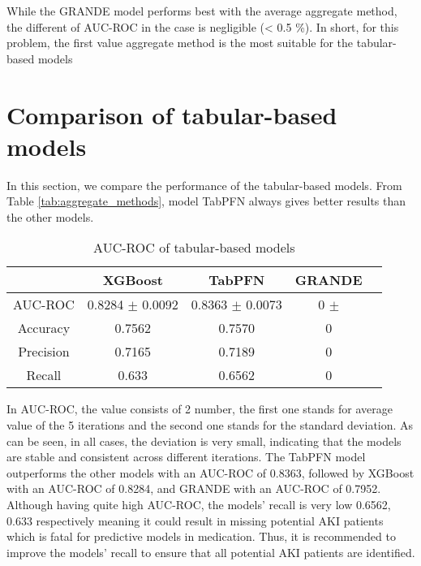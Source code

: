 \documentclass[../main.tex]{subfiles}
\begin{document}
While the GRANDE model performs best with the average aggregate method, the different of AUC-ROC in the case is negligible (< 0.5 \%).
In short, for this problem, the first value aggregate method is the most suitable for the tabular-based models





\section{Comparison of tabular-based models}

In this section, we compare the performance of the tabular-based models. 
From Table \ref{tab:aggregate_methods}, model TabPFN always gives better results than the other models.

\begin{table}[H]
    \centering
    \caption{AUC-ROC of tabular-based models}
    \label{tab:tabular_models}
    \begin{tabular}{|c|c|c|c|c|}
        \hline
        \textbf{} & 
        \textbf{XGBoost} & 
        \textbf{TabPFN} & 
        \textbf{GRANDE} \\
        \hline

        AUC-ROC & 
        0.8284 $\pm$ 0.0092 & 
        0.8363 $\pm$ 0.0073& 
        0 $\pm$ \\

        Accuracy &
        0.7562 &
        0.7570 &
        0 \\

        Precision &
        0.7165 &
        0.7189 &
        0 \\

        Recall &
        0.633 &
        0.6562 &
        0 \\

        \hline
    \end{tabular}
\end{table}

In AUC-ROC, the value consists of 2 number, the first one stands for average value of the 5 iterations and the second one stands for the standard deviation.
As can be seen, in all cases, the deviation is very small, indicating that the models are stable and consistent across different iterations.
The TabPFN model outperforms the other models with an AUC-ROC of 0.8363, followed by XGBoost with an AUC-ROC of 0.8284, and GRANDE with an AUC-ROC of 0.7952.
Although having quite high AUC-ROC, the models' recall is very low 0.6562, 0.633 respectively meaning it could result in missing potential AKI patients which is fatal for predictive models in medication. 
Thus, it is recommended to improve the models' recall to ensure that all potential AKI patients are identified.
\end{document}
